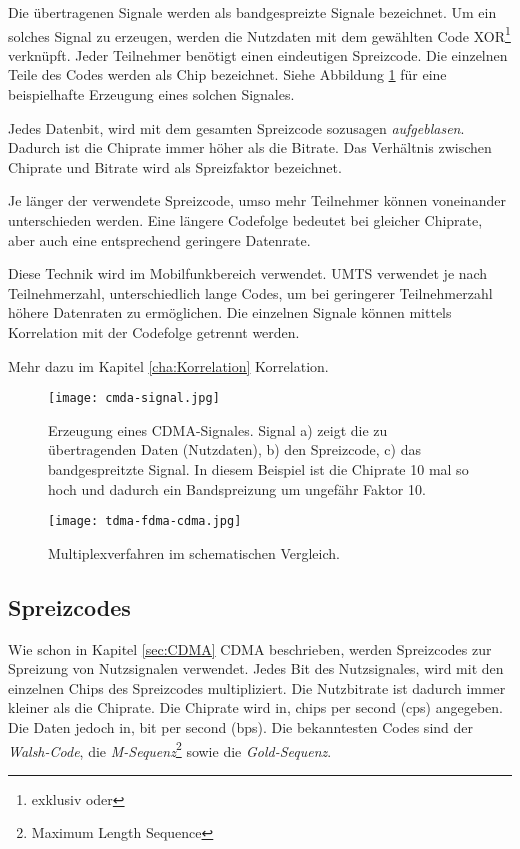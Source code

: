 Die übertragenen Signale werden als bandgespreizte Signale bezeichnet. Um ein solches Signal zu erzeugen, werden die Nutzdaten mit dem gewählten Code XOR\footnote{exklusiv oder} verknüpft. Jeder Teilnehmer benötigt einen eindeutigen Spreizcode. Die einzelnen Teile des Codes werden als Chip bezeichnet. Siehe Abbildung \ref{fig:CDMA} für eine beispielhafte Erzeugung eines solchen Signales. 

Jedes Datenbit, wird mit dem gesamten Spreizcode sozusagen \emph{aufgeblasen}. Dadurch ist die Chiprate immer höher als die Bitrate. Das Verhältnis zwischen Chiprate und Bitrate wird als Spreizfaktor bezeichnet.

Je länger der verwendete Spreizcode, umso mehr Teilnehmer können voneinander unterschieden werden.
Eine längere Codefolge bedeutet bei gleicher Chiprate, aber auch eine entsprechend geringere Datenrate. 

Diese Technik wird im Mobilfunkbereich verwendet. UMTS verwendet je nach Teilnehmerzahl, unterschiedlich lange Codes, um bei geringerer Teilnehmerzahl höhere Datenraten zu ermöglichen. Die einzelnen Signale können mittels Korrelation mit der Codefolge getrennt werden. 

Mehr dazu im Kapitel \ref{cha:Korrelation} Korrelation.

\begin{figure}[H]
\centering
\texttt{[image: cmda-signal.jpg]}
\caption{Erzeugung eines CDMA-Signales.
Signal a) zeigt die zu übertragenden Daten (Nutzdaten), b) den Spreizcode, c) das bandgespreitzte Signal.
In diesem Beispiel ist die Chiprate 10 mal so hoch und dadurch ein Bandspreizung um ungefähr Faktor 10.}
\label{fig:CDMA}
\end{figure}

\begin{figure}[H]
\centering
\texttt{[image: tdma-fdma-cdma.jpg]}
\caption{Multiplexverfahren im schematischen Vergleich. \cite{ImgMultiplex}}
\label{fig:Multiplex}
\end{figure}

\subsection{Spreizcodes}
\label{cha:Spreizcode}
Wie schon in Kapitel \ref{sec:CDMA} CDMA beschrieben, werden Spreizcodes zur Spreizung von Nutzsignalen verwendet. Jedes Bit des Nutzsignales, wird mit den einzelnen Chips des Spreizcodes multipliziert. Die Nutzbitrate ist dadurch immer kleiner als die Chiprate. Die Chiprate wird in, chips per second (cps) angegeben. Die Daten jedoch in, bit per second (bps). Die bekanntesten Codes sind der \emph{Walsh-Code}, die \emph{M-Sequenz}\footnote{Maximum Length Sequence} sowie die \emph{Gold-Sequenz}.

